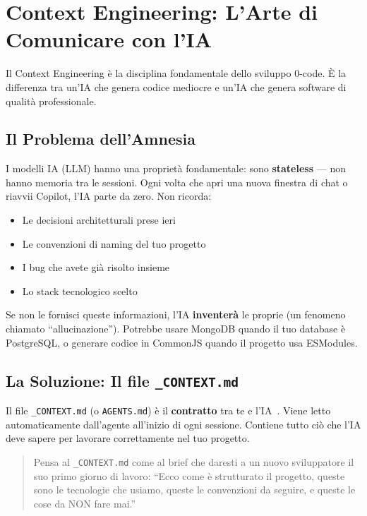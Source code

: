 \section{Context Engineering: L'Arte di Comunicare con l'IA}

Il Context Engineering è la disciplina fondamentale dello sviluppo 0-code. È la differenza tra un'IA che genera codice mediocre e un'IA che genera software di qualità professionale.

\subsection{Il Problema dell'Amnesia}

I modelli IA (LLM) hanno una proprietà fondamentale: sono \textbf{stateless} --- non hanno memoria tra le sessioni. Ogni volta che apri una nuova finestra di chat o riavvii Copilot, l'IA parte da zero. Non ricorda:
\begin{itemize}
  \item Le decisioni architetturali prese ieri
  \item Le convenzioni di naming del tuo progetto
  \item I bug che avete già risolto insieme
  \item Lo stack tecnologico scelto
\end{itemize}

Se non le fornisci queste informazioni, l'IA \textbf{inventerà} le proprie (un fenomeno chiamato ``allucinazione''). Potrebbe usare MongoDB quando il tuo database è PostgreSQL, o generare codice in CommonJS quando il progetto usa ESModules.

\subsection{La Soluzione: Il file \texttt{\_CONTEXT.md}}

Il file \texttt{\_CONTEXT.md} (o \texttt{AGENTS.md}) è il \textbf{contratto} tra te e l'IA~\cite{agents-md}. Viene letto automaticamente dall'agente all'inizio di ogni sessione. Contiene tutto ciò che l'IA deve sapere per lavorare correttamente nel tuo progetto.

\begin{quote}
Pensa al \texttt{\_CONTEXT.md} come al brief che daresti a un nuovo sviluppatore il suo primo giorno di lavoro: ``Ecco come è strutturato il progetto, queste sono le tecnologie che usiamo, queste le convenzioni da seguire, e queste le cose da NON fare mai.''
\end{quote}

